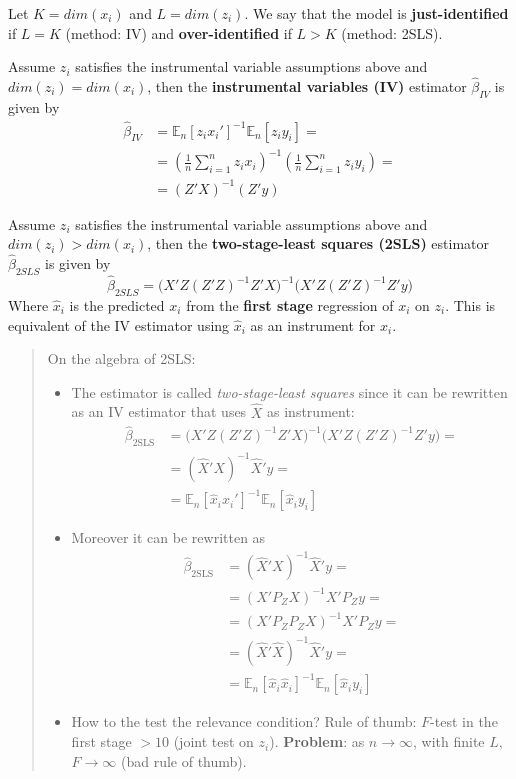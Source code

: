 \documentclass[12pt,]{book}
\providecommand{\tightlist}{%
  \setlength{\itemsep}{0pt}\setlength{\parskip}{0pt}}
\begin{document}
Let \(K = dim(x_i)\) and \(L = dim(z_i)\). We say that the model is \textbf{just-identified} if \(L = K\) (method: IV) and \textbf{over-identified} if \(L > K\) (method: 2SLS).

Assume \(z_i\) satisfies the instrumental variable assumptions above and \(dim(z_i) = dim(x_i)\), then the \textbf{instrumental variables (IV)} estimator \(\hat{\beta} _ {IV}\) is given by
\[
\begin{aligned}
    \hat{\beta} _ {IV} &= \mathbb E_n[z_i x_i']^{-1} \mathbb E_n[z_i y_i] = \\
    &= \left( \frac{1}{n} \sum _ {i=1}^n z_i x_i\right)^{-1} \left( \frac{1}{n} \sum _ {i=1}^n z_i y_i\right) = \\
    &= (Z'X)^{-1} (Z'y) 
\end{aligned}
\]

Assume \(z_i\) satisfies the instrumental variable assumptions above and \(dim(z_i) > dim(x_i)\), then the \textbf{two-stage-least squares (2SLS)} estimator \(\hat{\beta} _ {2SLS}\) is given by
\[
    \hat{\beta} _ {2SLS} =  \Big( X'Z (Z'Z)^{-1} Z'X \Big)^{-1} \Big( X'Z (Z'Z)^{-1} Z'y \Big)
\]
Where \(\hat{x}_i\) is the predicted \(x_i\) from the \textbf{first stage} regression of \(x_i\) on \(z_i\). This is equivalent of the IV estimator using \(\hat{x}_i\) as an instrument for \(x_i\).

\begin{quote}
On the algebra of 2SLS:

\begin{itemize}
\tightlist
\item
  The estimator is called \textit{two-stage-least squares} since it can be rewritten as an IV estimator that uses \(\hat{X}\) as instrument:
  \[
  \begin{aligned}
  \hat{\beta} _ {\text{2SLS}} &= \Big( X'Z (Z'Z)^{-1} Z'X \Big)^{-1} \Big( X'Z (Z'Z)^{-1} Z'y \Big) = \\
  &= (\hat{X}' X)^{-1} \hat{X}' y = \\
  &= \mathbb E_n[\hat{x}_i x_i']^{-1} \mathbb E_n[\hat{x}_i y_i] 
  \end{aligned}
  \]
\item
  Moreover it can be rewritten as
  \[
  \begin{aligned}
  \hat{\beta} _ {\text{2SLS}} &= (\hat{X}' X)^{-1} \hat{X}' y = \\
  &= (X' P_Z X)^{-1} X' P_Z y = \\
  &= (X' P_Z P_Z X)^{-1} X' P_Z y = \\
  &= (\hat{X}' \hat{X})^{-1} \hat{X}' y = \\
  &= \mathbb E_n [\hat{x}_i \hat{x}_i]^{-1} \mathbb E_n[\hat{x}_i y_i] 
  \end{aligned}
  \]
\item
  How to the test the relevance condition? Rule of thumb: \(F\)-test in the first stage \(>10\) (joint test on \(z_i\)).
  \textbf{Problem}: as \(n \to \infty\), with finite \(L\), \(F \to \infty\) (bad rule of thumb).
\end{itemize}
\end{quote}
\end{document}
